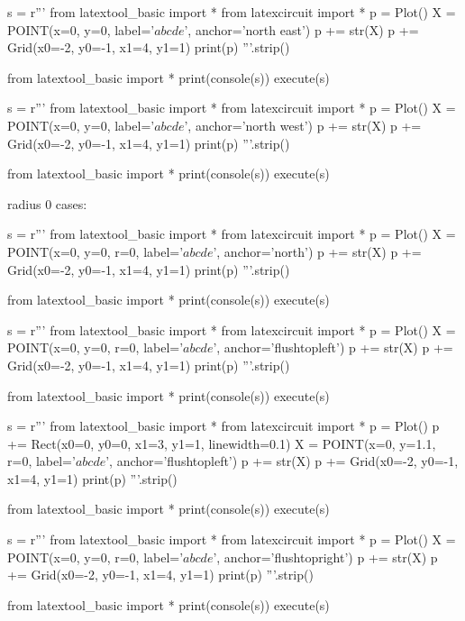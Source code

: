 \begin{python}
s = r'''
from latextool_basic import *
from latexcircuit import *
p = Plot()
X = POINT(x=0, y=0, label='$abcde$', anchor='north east')
p += str(X)
p += Grid(x0=-2, y0=-1, x1=4, y1=1)
print(p)
'''.strip()

from latextool_basic import *
print(console(s))
execute(s)
\end{python}

\begin{python}
s = r'''
from latextool_basic import *
from latexcircuit import *
p = Plot()
X = POINT(x=0, y=0, label='$abcde$', anchor='north west')
p += str(X)
p += Grid(x0=-2, y0=-1, x1=4, y1=1)
print(p)
'''.strip()

from latextool_basic import *
print(console(s))
execute(s)
\end{python}



\newpage
radius 0 cases:
\begin{python}
s = r'''
from latextool_basic import *
from latexcircuit import *
p = Plot()
X = POINT(x=0, y=0, r=0, label='$abcde$', anchor='north')
p += str(X)
p += Grid(x0=-2, y0=-1, x1=4, y1=1)
print(p)
'''.strip()

from latextool_basic import *
print(console(s))
execute(s)
\end{python}


\newpage
\begin{python}
s = r'''
from latextool_basic import *
from latexcircuit import *
p = Plot()
X = POINT(x=0, y=0, r=0, label='$abcde$', anchor='flushtopleft')
p += str(X)
p += Grid(x0=-2, y0=-1, x1=4, y1=1)
print(p)
'''.strip()

from latextool_basic import *
print(console(s))
execute(s)
\end{python}

\begin{python}
s = r'''
from latextool_basic import *
from latexcircuit import *
p = Plot()
p += Rect(x0=0, y0=0, x1=3, y1=1, linewidth=0.1)
X = POINT(x=0, y=1.1, r=0, label='$abcde$', anchor='flushtopleft')
p += str(X)
p += Grid(x0=-2, y0=-1, x1=4, y1=1)
print(p)
'''.strip()

from latextool_basic import *
print(console(s))
execute(s)
\end{python}



\newpage
\begin{python}
s = r'''
from latextool_basic import *
from latexcircuit import *
p = Plot()
X = POINT(x=0, y=0, r=0, label='$abcde$', anchor='flushtopright')
p += str(X)
p += Grid(x0=-2, y0=-1, x1=4, y1=1)
print(p)
'''.strip()

from latextool_basic import *
print(console(s))
execute(s)
\end{python}

